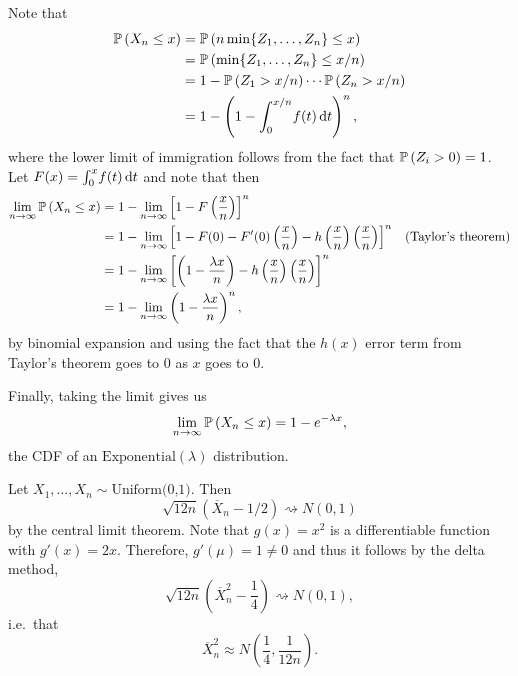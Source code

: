 \begin{ex}
  Note that
  \begin{align*}
    \P{X_n\leq x}
     & =\P{n\min\{Z_1,\ldots, Z_n\}\leq x}              \\
     & =\P{\min\{Z_1,\ldots, Z_n\}\leq x/n}             \\
     & =1 - \P{Z_1>x/n}\cdots\P{Z_n> x/n}               \\
     & =1-\left(1-\int_{0}^{x/n}\!f(t)\,\d{t}\right)^n,
  \end{align*}
  where the lower limit of immigration follows from the fact that $\P{Z_i>0}=1$.
  Let $F(x)=\int_0^x\!f(t)\,\d{t}$ and note that then
  \begin{align*}
    \lim_{n\to\infty}\P{X_n\leq x}
     & =1-\lim_{n\to\infty}\left[1-F\left(\frac{x}{n}\right)\right]^n \\
     & =1-\lim_{n\to\infty}\left[1-F(0)-F'(0)\left(\frac{x}{n}\right)
      -h\left(\frac{x}{n}\right)\left(\frac{x}{n}\right)\right]^n
     & (\text{Taylor's theorem})                                      \\
     & =1-\lim_{n\to\infty}\left[\left(1-\frac{\lambda x}{n}\right)
      -h\left(\frac{x}{n}\right)\left(\frac{x}{n}\right)\right]^n     \\
     & =1-\lim_{n\to\infty}\left(1-\frac{\lambda x}{n}\right)^n,
  \end{align*}
  by binomial expansion and using the fact that the $h(x)$ error term from
  Taylor's theorem goes to $0$ as $x$ goes to $0$.

  Finally, taking the limit gives us
  \begin{align*}
    \lim_{n\to\infty}\P{X_n\leq x}=1-e^{-\lambda x},
  \end{align*}
  the CDF of an $\text{Exponential}(\lambda)$ distribution.
\end{ex}

\begin{ex}
  Let $X_1,\ldots,X_n\sim\text{Uniform(0,1)}$. Then
  \[
    \sqrt{12n}(\overline{X}_n - 1/2) \rightsquigarrow N(0,1)
  \]
  by the central limit theorem. Note that $g(x)=x^2$ is a differentiable
  function with $g'(x)=2x$. Therefore, $g'(\mu)=1\neq 0$ and thus it follows by
  the delta method,
  \[
    \sqrt{12n}\left(\overline{X}_n^2-\frac{1}{4}\right)
    \rightsquigarrow N(0, 1),
  \]
  i.e.\ that
  \[
    \overline{X}_n^2\approx N\left(\frac{1}{4}, \frac{1}{12n}\right).
  \]
\end{ex}

